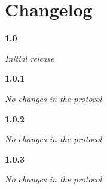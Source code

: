 \chapter{Changelog}

\noindent
\textbf{1.0}
\begin{itemize}
	\renewcommand{\labelitemi}{$\bullet$}
	\textit{Initial release}
\end{itemize}
\newline

\noindent
\textbf{1.0.1}
\begin{itemize}
	\renewcommand{\labelitemi}{$\bullet$}
	\textit{No changes in the protocol}
\end{itemize}
\newline

\noindent
\textbf{1.0.2}
\begin{itemize}
	\renewcommand{\labelitemi}{$\bullet$}
	\textit{No changes in the protocol}
\end{itemize}
\newline

\noindent
\textbf{1.0.3}
\begin{itemize}
	\renewcommand{\labelitemi}{$\bullet$}
	\textit{No changes in the protocol}
\end{itemize}
\newline